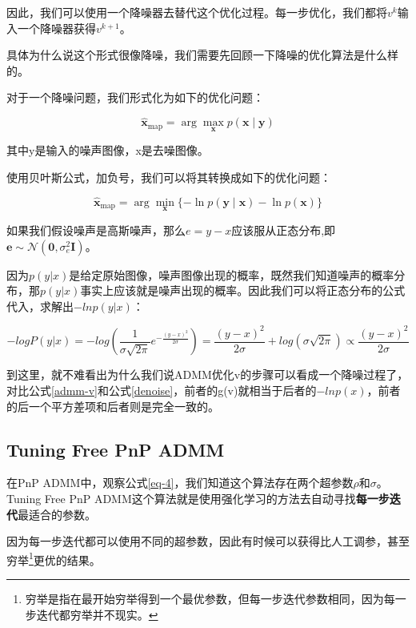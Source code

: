 \documentclass[10pt]{article}
\begin{document}
因此，我们可以使用一个降噪器去替代这个优化过程。每一步优化，我们都将$v^{k}$输入一个降噪器获得$v^{k+1}$。

具体为什么说这个形式很像降噪，我们需要先回顾一下降噪的优化算法是什么样的。

对于一个降噪问题，我们形式化为如下的优化问题：

\begin{equation}
\widehat{\boldsymbol{x}}_{\operatorname{map}}=\arg \max _{\boldsymbol{x}} p(\boldsymbol{x} \mid \boldsymbol{y})
\end{equation}

其中y是输入的噪声图像，x是去噪图像。

使用贝叶斯公式，加负号，我们可以将其转换成如下的优化问题：

\begin{equation}
\widehat{\boldsymbol{x}}_{\operatorname{map}}=\arg \min _{\boldsymbol{x}}\{-\ln p(\boldsymbol{y} \mid \boldsymbol{x})-\ln p(\boldsymbol{x})\}
\label{denoise}
\end{equation}

如果我们假设噪声是高斯噪声，那么$e=y-x$应该服从正态分布,即$\boldsymbol{e} \sim \mathcal{N}\left(\mathbf{0}, \sigma_{e}^{2} \boldsymbol{I}\right)$。

因为$p(y|x)$是给定原始图像，噪声图像出现的概率，既然我们知道噪声的概率分布，那$p(y|x)$事实上应该就是噪声出现的概率。因此我们可以将正态分布的公式代入，求解出$-ln p(y|x)$：

$$- logP(y|x) = -log(\frac{1}{\sigma\sqrt{2\pi}}e^{-\frac{(y-x)^2}{2\sigma}})=\frac{(y-x)^2}{2\sigma}+log(\sigma\sqrt{2\pi})\propto \frac{(y-x)^2}{2\sigma}$$

到这里，就不难看出为什么我们说ADMM优化v的步骤可以看成一个降噪过程了，对比公式\ref{admm-v}和公式\ref{denoise}，前者的g(v)就相当于后者的$-lnp(x)$，前者的后一个平方差项和后者则是完全一致的。

\subsection{Tuning Free PnP ADMM}

在PnP ADMM中，观察公式\ref{eq-4}，我们知道这个算法存在两个超参数$\rho$和$\sigma$。Tuning Free PnP ADMM\cite{wei2020tuning}这个算法就是使用强化学习的方法去自动寻找\textbf{每一步迭代}最适合的参数。

因为每一步迭代都可以使用不同的超参数，因此有时候可以获得比人工调参，甚至穷举\footnote{穷举是指在最开始穷举得到一个最优参数，但每一步迭代参数相同，因为每一步迭代都穷举并不现实。}更优的结果。
\end{document}
